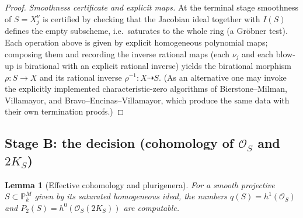 \documentclass{amsart}
\theoremstyle{plain}
\newtheorem{lemma}{Lemma}
\theoremstyle{definition}
\newcommand{\PP}{\mathbb{P}}
\newcommand{\cO}{\mathcal{O}}
\begin{document}
\begin{proof}
\smallskip\noindent\emph{Smoothness certificate and explicit maps.}  At the
terminal stage smoothness of $S=X_{j}^{\nu}$ is certified by checking that the
Jacobian ideal together with $I(S)$ defines the empty subscheme, i.e.\ saturates
to the whole ring (a Gr\"obner test).  Each operation above is given by explicit
homogeneous polynomial maps; composing them and recording the inverse rational
maps (each $\nu_j$ and each blow-up is birational with an explicit rational
inverse) yields the birational morphism $\rho\colon S\to X$ and its rational
inverse $\rho^{-1}\colon X\dashrightarrow S$.  (As an alternative one may invoke
the explicitly implemented characteristic-zero algorithms of Bierstone--Milman,
Villamayor, and Bravo--Encinas--Villamayor, which produce the same data with
their own termination proofs.)
\end{proof}

\subsection{Stage B: the decision (cohomology of $\cO_S$ and $2K_S$)}

\begin{lemma}[Effective cohomology and plurigenera]\label{lem:cohomology}
For a smooth projective $S\subset\PP^M_k$ given by its saturated homogeneous
ideal, the numbers $q(S)=h^1(\cO_S)$ and $P_2(S)=h^0(\cO_S(2K_S))$ are
computable.
\end{lemma}
\end{document}
